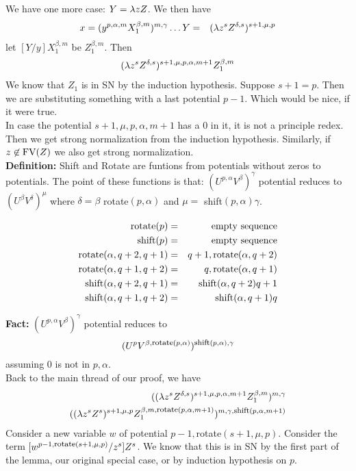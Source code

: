 We have one more case: $Y = \lambda zZ$. We then have
\begin{eqnarray*}
  x = (y^{p,\alpha,m}X_1^{\beta,m})^{m,\gamma}\ldots
  Y &=& (\lambda z^s Z^{\delta,s})^{s + 1,\mu,p}
\end{eqnarray*}
let $[Y/y]X_1^{\beta,m}$ be $Z_1^{\beta,m}$. Then
\begin{eqnarray*}
  (\lambda z^sZ^{\delta,s})^{s+1,\mu,p,\alpha,m+1}Z_1^{\beta,m}
\end{eqnarray*}
We know that $Z_1$ is in SN by the induction hypothesis. Suppose $s + 1 = p$. Then we are substituting something with a last potential $p - 1$. Which would be nice, if it were true.\\

In case the potential $s+1,\mu,p,\alpha,m+1$ has a $0$ in it, it is not a principle redex. Then we get strong normalization from the induction hypothesis. Similarly, if $z \not\in \hbox{FV}(Z)$ we also get strong normalization.\\

\textbf{Definition:} Shift and Rotate are funtions from potentials without zeros to potentials. The point of these functions is that: $(U^{p,\alpha} V^\beta)^\gamma$ potential reduces to $(U^{\beta} V^\delta)^\mu$ where $\delta = \beta$ rotate$(p,\alpha)$ and $\mu =$ shift$(p,\alpha)\gamma$.

{
  \def\rotate{\hbox{rotate}}
  \def\shift{\hbox{shift}}
  \begin{eqnarray*}
    \rotate(p) &=& \hbox{empty sequence}\\
    \shift(p) &=& \hbox{empty sequence}\\
    \rotate(\alpha,q+2,q+1) &=& q+1,\rotate(\alpha,q+2)\\
    \rotate(\alpha,q+1,q+2) &=& q, \rotate(\alpha,q+1)\\
    \shift(\alpha,q+2,q+1) &=& \shift(\alpha,q+2)q+1\\
    \shift(\alpha,q+1,q+2) &=& \shift(\alpha,q+1)q\\
  \end{eqnarray*}

}
\textbf{Fact:} $(U^{p,\alpha}V^\beta)^{\gamma}$ potential reduces to
\begin{equation*}
  (U^p V^{\beta,\hbox{\footnotesize rotate}(p,\alpha)})^{\hbox{\footnotesize shift}(p,\alpha),\gamma}
\end{equation*}
assuming $0$ is not in $p,\alpha$.\\

Back to the main thread of our proof, we have
\begin{eqnarray*}
  ((\lambda z^sZ^{\delta,s})^{s+1,\mu,p,\alpha,m+1}Z_1^{\beta,m})^{m,\gamma}\\
  ((\lambda z^sZ^s)^{s+1,\mu,p}Z_1^{\beta,m,\hbox{\footnotesize rotate}(p,\alpha,m+1)})^{m,\gamma,\hbox{\footnotesize shift}(p,\alpha,m+1)}
\end{eqnarray*}
Consider a new variable $w$ of potential $p-1,$rotate$(s+1,\mu,p)$. Consider the term $[w^{p-1,\hbox{\footnotesize rotate}(s+1,\mu,p)}/z^s]Z^s$. We know that this is in SN by the first part of the lemma, our original special case, or by induction hypothesis on $p$. \qqed